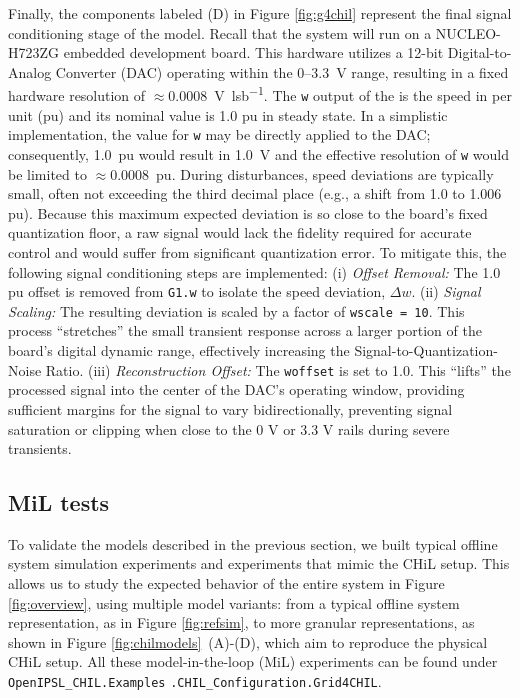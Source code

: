Finally, the components labeled (D) in Figure \ref{fig:g4chil} represent the final signal conditioning stage of the \plant{} model. Recall that the \plant{} system will run on a NUCLEO-H723ZG embedded development board. This hardware utilizes a 12-bit Digital-to-Analog Converter (DAC) operating within the 0--\SI{3.3}{\volt} range, resulting in a fixed hardware resolution of $\approx$\SI{0.0008}{\volt \per lsb}. The \texttt{w} output of the \generatorunit{} is the speed in per unit (pu) and its nominal value is 1.0 pu in steady state. In a simplistic implementation, the value for \texttt{w} may be directly applied to the DAC; consequently, \SI{1.0}{pu} would result in \SI{1.0}{\volt} and the effective resolution of \texttt{w} would be limited to $\approx$\SI{0.0008}{pu}. During disturbances, speed deviations are typically small, often not exceeding the third decimal place (e.g., a shift from 1.0 to 1.006 pu). Because this maximum expected deviation is so close to the board’s fixed quantization floor, a raw signal would lack the fidelity required for accurate control and would suffer from significant quantization error. To mitigate this, the following signal conditioning steps are implemented: (i) \emph{Offset Removal:} The 1.0 pu offset is removed from \texttt{G1.w} to isolate the speed deviation, $\Delta w$. (ii) \emph{Signal Scaling:} The resulting deviation is scaled by a factor of \texttt{wscale = 10}. This process ``stretches'' the small transient response across a larger portion of the board's digital dynamic range, effectively increasing the Signal-to-Quantization-Noise Ratio. (iii) \emph{Reconstruction Offset:} The \texttt{woffset} is set to 1.0. This ``lifts'' the processed signal into the center of the DAC's operating window, providing sufficient margins for the signal to vary bidirectionally, preventing signal saturation or clipping when close to the 0 V or 3.3 V rails during severe transients.

\subsection{MiL tests}\label{sec:mil-tests}

To validate the models described in the previous section, we built typical offline system simulation experiments and experiments that mimic the CHiL setup. This allows us to study the expected behavior of the entire system in Figure \ref{fig:overview}, using multiple model variants: from a typical offline system representation, as in Figure \ref{fig:refsim}, to more granular representations, as shown in Figure \ref{fig:chilmodels}~(A)-(D), which aim to reproduce the physical CHiL setup. All these model-in-the-loop (MiL) experiments can be found under \texttt{OpenIPSL\_CHIL.Examples} \texttt{.CHIL\_Configuration.Grid4CHIL}.

